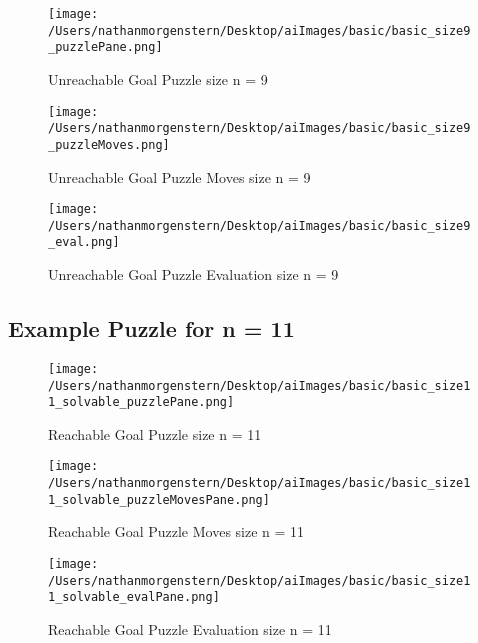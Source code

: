 \documentclass{report}
\begin{document}
	\begin{figure}[H]
	\centering
	\texttt{[image: /Users/nathanmorgenstern/Desktop/aiImages/basic/basic\_size9\_puzzlePane.png]}
	\caption{Unreachable Goal Puzzle size n = 9}
	\label{fig: Basic Evaluation n = 9 unreachable goal puzzle }
	\end{figure}
	
	\begin{figure}[H]
	\centering
	\texttt{[image: /Users/nathanmorgenstern/Desktop/aiImages/basic/basic\_size9\_puzzleMoves.png]}
	\caption{Unreachable Goal Puzzle Moves size n = 9}
	\label{fig: Basic Evaluation n = 9 unreachable goal puzzle moves}
	\end{figure}
	
	\begin{figure}[H]
	\centering
	\texttt{[image: /Users/nathanmorgenstern/Desktop/aiImages/basic/basic\_size9\_eval.png]}
	\caption{Unreachable Goal Puzzle Evaluation size n = 9}
	\label{fig: Basic Evaluation n = 9 unreachable goal puzzle evaluation}
	\end{figure}


\subsection{Example Puzzle for n = 11}

	\begin{figure}[H]
	\centering
	\texttt{[image: /Users/nathanmorgenstern/Desktop/aiImages/basic/basic\_size11\_solvable\_puzzlePane.png]}
	\caption{Reachable Goal Puzzle size n = 11}
	\label{fig: Basic Evaluation n = 11 reachable goal puzzle }
	\end{figure}
	
	\begin{figure}[H]
	\centering
	\texttt{[image: /Users/nathanmorgenstern/Desktop/aiImages/basic/basic\_size11\_solvable\_puzzleMovesPane.png]}
	\caption{Reachable Goal Puzzle Moves size n = 11}
	\label{fig: Basic Evaluation n = 11 reachable goal puzzle moves}
	\end{figure}
	
	\begin{figure}[H]
	\centering
	\texttt{[image: /Users/nathanmorgenstern/Desktop/aiImages/basic/basic\_size11\_solvable\_evalPane.png]}
	\caption{Reachable Goal Puzzle Evaluation size n = 11}
	\label{fig: Basic Evaluation n = 11 reachable goal puzzle evaluation}
	\end{figure}
	
\end{document}
